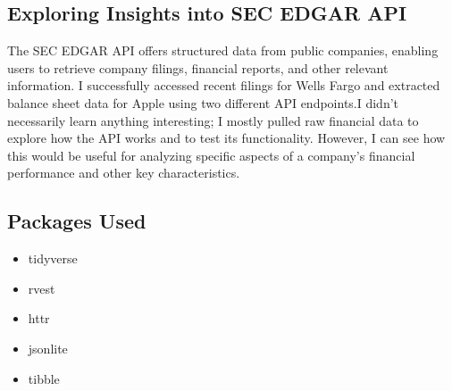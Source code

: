 \documentclass{article}
\begin{document}
\subsection{Exploring Insights into SEC EDGAR API}
\hspace*{2em} The SEC EDGAR API offers structured data from public companies, enabling users to retrieve company filings, financial reports, and other relevant information. I successfully accessed recent filings for Wells Fargo and extracted balance sheet data for Apple using two different API endpoints.I didn't necessarily learn anything interesting; I mostly pulled raw financial data to explore how the API works and to test its functionality. However, I can see how this would be useful for analyzing specific aspects of a company's financial performance and other key characteristics.

\subsection{Packages Used}
\begin{itemize}
    \item tidyverse
    \item rvest
    \item httr
    \item jsonlite
    \item tibble
\end{itemize}
\end{document}

